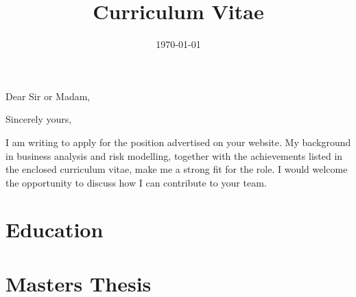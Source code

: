 \documentclass[11pt,a4paper,sans]{moderncv} %
\title{Curriculum Vitae}
\begin{document}


\clearpage

\date{\today} %
\opening{Dear Sir or Madam,} %
\closing{Sincerely yours,} %

\makelettertitle %

I am writing to apply for the position advertised on your website. My background in business analysis and risk modelling, together with the achievements listed in the enclosed curriculum vitae, make me a strong fit for the role. I would welcome the opportunity to discuss how I can contribute to your team.

\makeletterclosing %

\newpage


\makecvtitle %


\section{Education}


\section{Masters Thesis}
\end{document}
